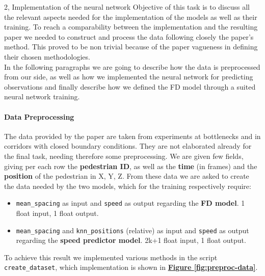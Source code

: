\documentclass[10pt,a4paper]{article}
\begin{document}
\begin{task}{2, Implementation of the neural network}
Objective of this task is to discuss all the relevant aspects needed for the implementation of the models as well as their training. To reach a comparability between the implementation and the resulting paper we needed to construct and process the data following closely the paper's method. This proved to be non trivial because of the paper vagueness in defining their chosen methodologies.\\
In the following paragraphs we are going to describe how the data is preprocessed from our side, as well as how we implemented the neural network for predicting observations and finally describe how we defined the FD model through a suited neural network training. 

\paragraph{Data Preprocessing}
The data provided by the paper are taken from experiments
at bottlenecks and in corridors with closed
boundary conditions. They are not elaborated already for the final task, needing therefore some preprocessing. We are given few fields, giving per each row the \textbf{pedestrian ID}, as well as the \textbf{time} (in frames) and the \textbf{position} of the pedestrian in X, Y, Z. From these data we are asked to create the data needed by the two models, which for the training respectively require:
\begin{itemize}
    \item \texttt{mean\_spacing} as input and \texttt{speed} as output regarding the \textbf{FD model}. 1 float input, 1 float output.
    \item \texttt{mean\_spacing} and \texttt{knn\_positions} (relative) as input and \texttt{speed} as output regarding the \textbf{speed predictor model}. 2k+1 float input, 1 float output.
\end{itemize}

To achieve this result we implemented various methods in the script \texttt{create\_dataset}, which implementation is shown in \textbf{\hyperref[fig:preproc-data]{Figure \ref{fig:preproc-data}}}. 


\end{task}
\end{document}
